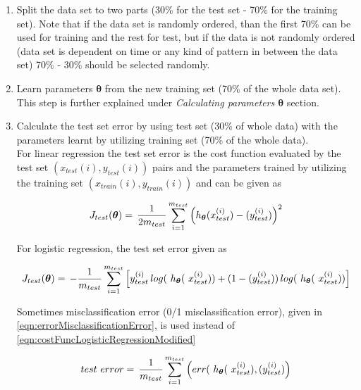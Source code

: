  \begin{enumerate}
 
  \item Split the data set to two parts (30\% for the test set - 70\% for the training set). 
  Note that if the data set is randomly ordered, than the first 70\% can be used for training and the rest for test, but if the data is not randomly ordered (data set is dependent on time or any kind of pattern in between the data set) 70\% - 30\% should be selected randomly.
  
  \item Learn parameters $\bm{\theta}$ from the new training set (70\% of the whole data set). This step is further explained under \emph{Calculating parameters ${\bm{\theta}}$} section.

  \item Calculate the test set error by using test set (30\% of whole data) with the parameters learnt by utilizing training set (70\% of the whole data).\\
  For linear regression the test set error is the cost function evaluated by the test set $(x_{test}(i), y_{test}(i))$ pairs and the parameters trained by utilizing the training set $(x_{train}(i), y_{train}(i))$ and can be given as
	
	\begin{equation}{\label{eqn:costFuncTest}}
	J_{test}({\bm{\theta}})
	=\,
	\frac{1}{2m_{test}} \sum\limits_{i=1}^{m_{test}} \Big(h_{\bm{\theta}}(x_{test}^{(i)}) - (y_{test}^{(i)})\Big)^2  
	\end{equation} 
	
	For logistic regression, the test set error given as
	
	\begin{equation}{\label{eqn:costFuncLogisticRegressionModified}}
	J_{test}({\bm{\theta}})
	=\,
	-\frac{1}{m_{test}} \sum\limits_{i=1}^{m_{test}} \Big[y_{test}^{(i)}\,log(\ h_{\bm{\theta}}(\ x_{test}^{(i)})) + (1-(y_{test}^{(i)}))\,log(\ h_{\bm{\theta}}(\ x_{test}^{(i)}))\Big]
	\end{equation} 
	
	Sometimes misclassification error (0/1 misclassification error), given in \ref{eqn:errorMisclassificationError}, is used instead of \ref{eqn:costFuncLogisticRegressionModified}
	
	\begin{equation}{\label{eqn:errorMisclassificationError}}
	 test\ error
	=\,
	\frac{1}{m_{test}} \sum\limits_{i=1}^{m_{test}} \Big(err(\ h_{\bm{\theta}}(\ x_{test}^{(i)}), (y_{test}^{(i)})\Big)  
	\end{equation}
	

\end{enumerate}
